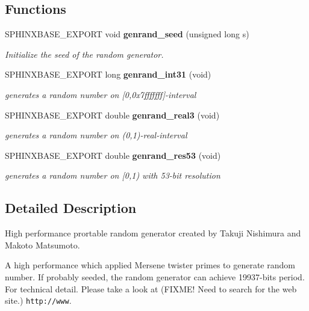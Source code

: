 \subsection*{Functions}
\begin{DoxyCompactItemize}
\item 
S\+P\+H\+I\+N\+X\+B\+A\+S\+E\+\_\+\+E\+X\+P\+O\+R\+T void {\bf genrand\+\_\+seed} (unsigned long s)\label{genrand_8h_a2881c7b606d9a2b2852e5946d71d32b7}

\begin{DoxyCompactList}\small\item\em Initialize the seed of the random generator. \end{DoxyCompactList}\item 
S\+P\+H\+I\+N\+X\+B\+A\+S\+E\+\_\+\+E\+X\+P\+O\+R\+T long {\bf genrand\+\_\+int31} (void)\label{genrand_8h_a10263695978c84103fb3526fdae21d4c}

\begin{DoxyCompactList}\small\item\em generates a random number on [0,0x7fffffff]-\/interval \end{DoxyCompactList}\item 
S\+P\+H\+I\+N\+X\+B\+A\+S\+E\+\_\+\+E\+X\+P\+O\+R\+T double {\bf genrand\+\_\+real3} (void)\label{genrand_8h_ad5fbfda1cb738d2beff277444bc71b1a}

\begin{DoxyCompactList}\small\item\em generates a random number on (0,1)-\/real-\/interval \end{DoxyCompactList}\item 
S\+P\+H\+I\+N\+X\+B\+A\+S\+E\+\_\+\+E\+X\+P\+O\+R\+T double {\bf genrand\+\_\+res53} (void)\label{genrand_8h_a2fca03c5dad1835f55e09c6e66d3b960}

\begin{DoxyCompactList}\small\item\em generates a random number on [0,1) with 53-\/bit resolution \end{DoxyCompactList}\end{DoxyCompactItemize}


\subsection{Detailed Description}
High performance prortable random generator created by Takuji Nishimura and Makoto Matsumoto. 

A high performance which applied Mersene twister primes to generate random number. If probably seeded, the random generator can achieve 19937-\/bits period. For technical detail. Please take a look at (F\+I\+X\+M\+E! Need to search for the web site.) {\tt http\+://www}. 